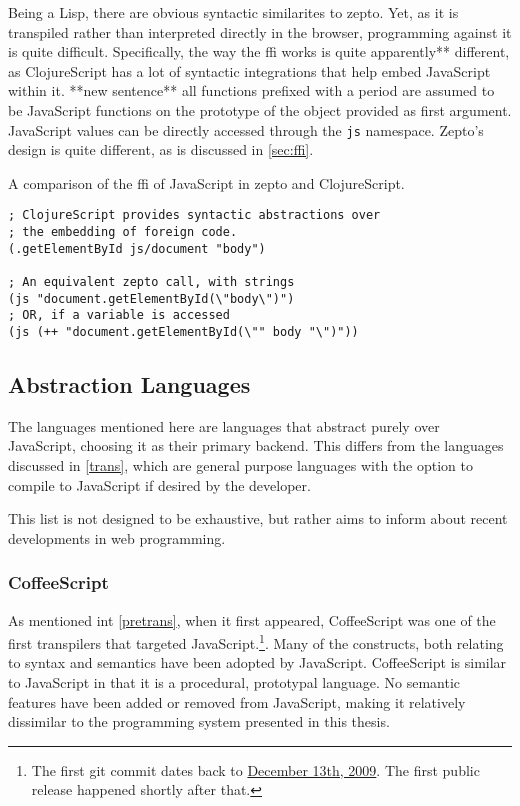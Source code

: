\documentclass[oneside,11pt,xetex]{scrbook}
\begin{document}
Being a Lisp, there are obvious syntactic similarites to zepto. Yet, as it is
transpiled rather than interpreted directly in the browser, programming against
it is quite difficult. Specifically, the way the \gls{ffi} works is quite apparently** 
different, as ClojureScript has a lot of syntactic integrations that help embed
JavaScript within it. **new sentence** all functions prefixed with a period are assumed to
be JavaScript functions on the prototype of the object provided as first argument.
JavaScript values can be directly accessed through the \texttt{js} namespace.
Zepto's design is quite different, as is discussed in \ref{sec:ffi}.

\begin{listing}[H]
\caption{A comparison of the \gls{ffi} of JavaScript in zepto and ClojureScript.}
\begin{verbatim}
; ClojureScript provides syntactic abstractions over
; the embedding of foreign code.
(.getElementById js/document "body")

; An equivalent zepto call, with strings
(js "document.getElementById(\"body\")")
; OR, if a variable is accessed
(js (++ "document.getElementById(\"" body "\")"))
\end{verbatim}
\end{listing}

\subsection{Abstraction Languages}

The languages mentioned here are languages that abstract purely over JavaScript,
choosing it as their primary backend. This differs from the languages discussed
in \ref{trans}, which are general purpose languages with the option to compile
to JavaScript if desired by the developer.

This list is not designed to be exhaustive, but rather aims to inform about
recent developments in web programming.

\subsubsection{CoffeeScript}

As mentioned int \ref{pretrans}, when it first appeared, CoffeeScript was one of the first transpilers that targeted JavaScript.\footnote{The first git commit
dates back to
\href{https://github.com/jashkenas/coffeescript/commit/8e9d637985d2dc9b44922076ad54ffef7fa8e9c2}{December 13th, 2009}.
The first public release happened shortly after that.}. Many of the constructs, both relating to syntax and semantics
have been adopted by JavaScript.
CoffeeScript is similar to JavaScript in that it is a procedural, prototypal
language. No semantic features have been added or removed from JavaScript,
making it relatively dissimilar to the programming system presented in this
thesis.
\end{document}
